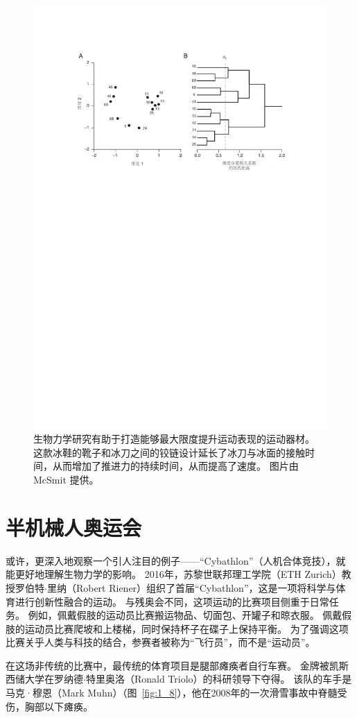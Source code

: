 \begin{figure}[!htb]
	\centering
	\includegraphics[width=0.6\linewidth]{chap1/1_7}
	\caption{生物力学研究有助于打造能够最大限度提升运动表现的运动器材。
		这款冰鞋的靴子和冰刀之间的铰链设计延长了冰刀与冰面的接触时间，从而增加了推进力的持续时间，从而提高了速度。
		图片由 McSmit 提供。 \label{fig:1_7}}
\end{figure}



\section{半机械人奥运会}


或许，更深入地观察一个引人注目的例子——“Cybathlon”（人机合体竞技），就能更好地理解生物力学的影响。
2016年，苏黎世联邦理工学院（ETH Zurich）教授罗伯特$\cdot$里纳（Robert Riener）组织了首届“Cybathlon”，这是一项将科学与体育进行创新性融合的运动。
与残奥会不同，这项运动的比赛项目侧重于日常任务。
例如，佩戴假肢的运动员比赛搬运物品、切面包、开罐子和晾衣服。
佩戴假肢的运动员比赛爬坡和上楼梯，同时保持杯子在碟子上保持平衡。
为了强调这项比赛关乎人类与科技的结合，参赛者被称为“飞行员”，而不是“运动员”。


在这场非传统的比赛中，最传统的体育项目是腿部瘫痪者自行车赛。
金牌被凯斯西储大学在罗纳德$\cdot$特里奥洛（Ronald Triolo）的科研领导下夺得。
该队的车手是马克·穆恩（Mark Muhn）（图~\ref{fig:1_8}），他在2008年的一次滑雪事故中脊髓受伤，胸部以下瘫痪。


